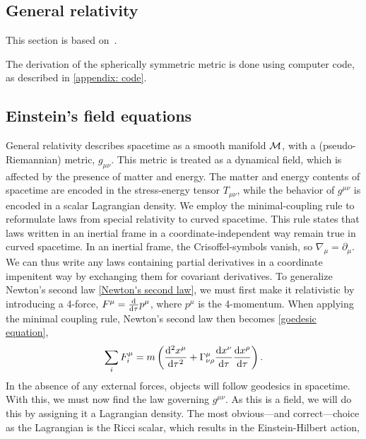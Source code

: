 \subsection{General relativity}
This section is based on~\cite{carrollSpacetimeGeometryIntroduction2019,glendenningCompactStarsNuclear2012}.

The derivation of the spherically symmetric metric is done using computer code, as described in \autoref{appendix: code}.



\subsection{Einstein's field equations}

General relativity describes spacetime as a smooth manifold $\mathcal M$, with a (pseudo-Riemannian) metric, $g_{\mu \nu}$.
This metric is treated as a dynamical field, which is affected by the presence of matter and energy.
The matter and energy contents of spacetime are encoded in the stress-energy tensor $T_{\mu \nu}$, while the behavior of $g^{\mu \nu}$ is encoded in a scalar Lagrangian density.
We employ the minimal-coupling rule to reformulate laws from special relativity to curved spacetime.
This rule states that laws written in an inertial frame in a coordinate-independent way remain true in curved spacetime.
In an inertial frame, the Crisoffel-symbols vanish, so $\nabla_\mu = \partial_\mu$.
We can thus write any laws containing partial derivatives in a coordinate impenitent way by exchanging them for covariant derivatives.
To generalize Newton's second law \autoref{Newton's second law}, we must first make it relativistic by introducing a 4-force, $F^\mu = \odv{}{\tau} p^\mu $, where $p^\mu$ is the 4-momentum.
When applying the minimal coupling rule, Newton's second law then becomes \autoref{goedesic equation},~\autocite{hartleGravityIntroductionEinstein2021}
%
\begin{equation}
    \label{covariant version of second law}
    \sum_i F_i^\mu 
    = m \left(
        \odv[2]{x^\mu}{\tau} + \Gamma^\mu_{\nu \rho} \odv{x^\nu}{\tau} \odv{x^\rho}{\tau}
    \right).
\end{equation}
%
In the absence of any external forces, objects will follow geodesics in spacetime.
With this, we must now find the law governing $g^{\mu\nu}$.
As this is a field, we will do this by assigning it a Lagrangian density.
The most obvious---and correct---choice as the Lagrangian is the Ricci scalar, which results in the Einstein-Hilbert action,
